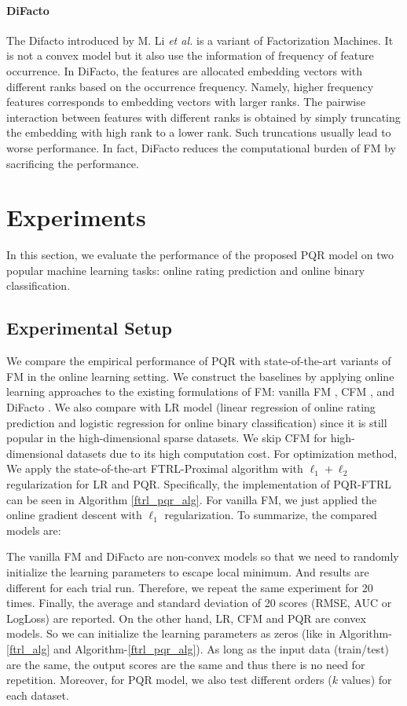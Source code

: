\documentclass[letterpaper]{article} %
\theoremstyle{plain}
\theoremstyle{definition}
\begin{document}
\paragraph{DiFacto}
The Difacto introduced by M. Li \textit{et al.} \cite{LiDifacto} is a variant of Factorization Machines. It is not a convex model but it also use the information of frequency of feature occurrence. In DiFacto, the features are allocated embedding vectors with different ranks based on the occurrence frequency. Namely, higher frequency features corresponds to embedding vectors with larger ranks. The pairwise interaction between features with different ranks is obtained by simply truncating the embedding with high rank to a lower rank. Such truncations usually lead to worse performance. In fact, DiFacto reduces the computational burden of FM by sacrificing the performance. 

\section{Experiments}\label{exp_sec}
In this section, we evaluate the performance of the proposed PQR model on two popular machine learning tasks: online rating prediction and online binary classification.

\subsection{Experimental Setup}
We compare the empirical performance of PQR with state-of-the-art variants of FM in the online learning setting. We construct the baselines by applying online learning approaches to the existing formulations of FM: vanilla FM \cite{RendleICDM}, CFM \cite{YamadaKDD}, and DiFacto \cite{LiDifacto}.  
We also compare with LR model (linear regression of online rating prediction and logistic regression for online binary classification) since it is still popular in the high-dimensional sparse datasets. We skip CFM for high-dimensional datasets due to its high computation cost. For optimization method, We apply the state-of-the-art FTRL-Proximal algorithm \cite{McMahanKDD} with $\ell_1+\ell_2$ regularization for LR and PQR. Specifically, the implementation of PQR-FTRL can be seen in Algorithm \ref{ftrl_pqr_alg}. For vanilla FM, we just applied the online gradient descent with $\ell_1$ regularization. To summarize, the compared models are:

The vanilla FM and DiFacto are non-convex models so that we need to randomly initialize the learning parameters to escape local minimum. And results are different for each trial run. Therefore, we repeat the same experiment for 20 times. Finally, the average and standard deviation of 20 scores (RMSE, AUC or LogLoss) are reported. On the other hand, LR, CFM and PQR are convex models. So we can initialize the learning parameters as zeros (like in Algorithm-\ref{ftrl_alg} and Algorithm-\ref{ftrl_pqr_alg}). As long as the input data (train/test) are the same, the output scores are the same and thus there is no need for repetition. Moreover, for PQR model, we also test different orders ($k$ values) for each dataset.
\end{document}
